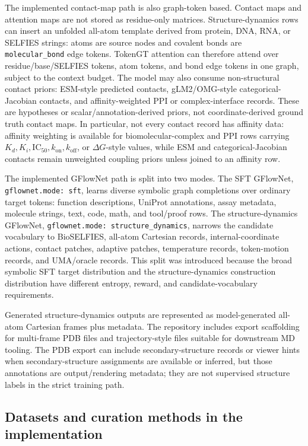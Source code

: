 \documentclass[11pt]{article}
\begin{document}
The implemented contact-map path is also graph-token based. Contact maps and attention maps are not stored as residue-only matrices. Structure-dynamics rows can insert an unfolded all-atom template derived from protein, DNA, RNA, or SELFIES strings: atoms are source nodes and covalent bonds are \texttt{molecular\_bond} edge tokens. TokenGT attention can therefore attend over residue/base/SELFIES tokens, atom tokens, and bond edge tokens in one graph, subject to the context budget. The model may also consume non-structural contact priors: ESM-style predicted contacts, gLM2/OMG-style categorical-Jacobian contacts, and affinity-weighted PPI or complex-interface records. These are hypotheses or scalar/annotation-derived priors, not coordinate-derived ground truth contact maps. In particular, not every contact record has affinity data: affinity weighting is available for biomolecular-complex and PPI rows carrying \(K_d,K_i,\mathrm{IC}_{50},k_{\mathrm{on}},k_{\mathrm{off}}\), or \(\Delta G\)-style values, while ESM and categorical-Jacobian contacts remain unweighted coupling priors unless joined to an affinity row.

The implemented GFlowNet path is split into two modes. The SFT GFlowNet, \texttt{gflownet.mode: sft}, learns diverse symbolic graph completions over ordinary target tokens: function descriptions, UniProt annotations, assay metadata, molecule strings, text, code, math, and tool/proof rows. The structure-dynamics GFlowNet, \texttt{gflownet.mode: structure\_dynamics}, narrows the candidate vocabulary to BioSELFIES, all-atom Cartesian records, internal-coordinate actions, contact patches, adaptive patches, temperature records, token-motion records, and UMA/oracle records. This split was introduced because the broad symbolic SFT target distribution and the structure-dynamics construction distribution have different entropy, reward, and candidate-vocabulary requirements.

Generated structure-dynamics outputs are represented as model-generated all-atom Cartesian frames plus metadata. The repository includes export scaffolding for multi-frame PDB files and trajectory-style files suitable for downstream MD tooling. The PDB export can include secondary-structure records or viewer hints when secondary-structure assignments are available or inferred, but those annotations are output/rendering metadata; they are not supervised structure labels in the strict training path.

\subsection{Datasets and curation methods in the implementation}
\end{document}
